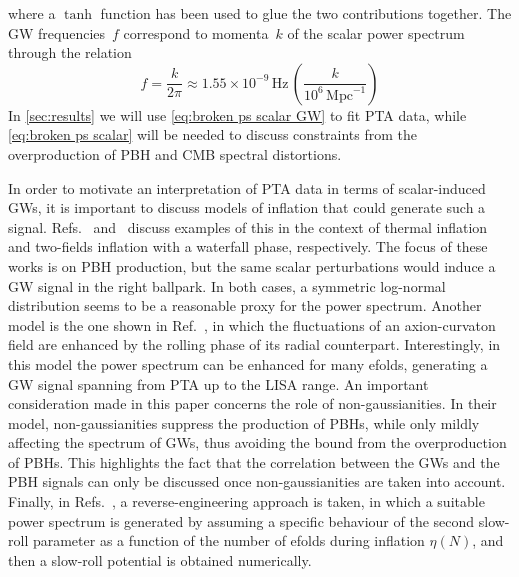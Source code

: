 \documentclass{article}
\begin{document}
where a $\tanh$ function has been used to glue the two contributions together.
The GW frequencies~$f$ correspond to momenta~$k$ of the scalar power spectrum through the relation
\begin{equation}
    f = \frac{k}{2\pi} \approx 1.55 \times 10^{-9}\,\mathrm{Hz}\, \left( \frac{k}{10^6\,\mathrm{Mpc}^{-1}} \right)
\end{equation}
%
In \cref{sec:results} we will use \cref{eq:broken ps scalar GW} to fit PTA data, while \cref{eq:broken ps scalar} will be needed to discuss constraints from the overproduction of PBH and CMB spectral distortions.

\bigskip 

In order to motivate an interpretation of PTA data in terms of scalar-induced GWs, it is important to discuss models of inflation that could generate such a signal. Refs.~\cite{Dimopoulos:2019wew} and~\cite{Clesse:2015wea} discuss examples of this in the context of thermal inflation and two-fields inflation with a waterfall phase, respectively. The focus of these works is on PBH production, but the same scalar perturbations would induce a GW signal in the right ballpark. In both cases, a symmetric log-normal distribution seems to be a reasonable proxy for the power spectrum.
Another model is the one shown in Ref.~\cite{Ferrante:2023bgz}, in which the fluctuations of an axion-curvaton field are enhanced by the rolling phase of its radial counterpart. Interestingly, in this model the power spectrum can be enhanced for many efolds, generating a GW signal spanning from PTA up to the LISA range. An important consideration made in this paper concerns the role of non-gaussianities. In their model, non-gaussianities suppress the production of PBHs, while only mildly affecting the spectrum of GWs, thus avoiding the bound from the overproduction of PBHs. This highlights the fact that the correlation between the GWs and the PBH signals can only be discussed once non-gaussianities are taken into account.
Finally, in Refs.~\cite{Franciolini:2022pav, Franciolini:2022tfm}, a reverse-engineering approach is taken, in which a suitable power spectrum is generated by assuming a specific behaviour of the second slow-roll parameter as a function of the number of efolds during inflation $\eta(N)$, and then a slow-roll potential is obtained numerically.
\end{document}
